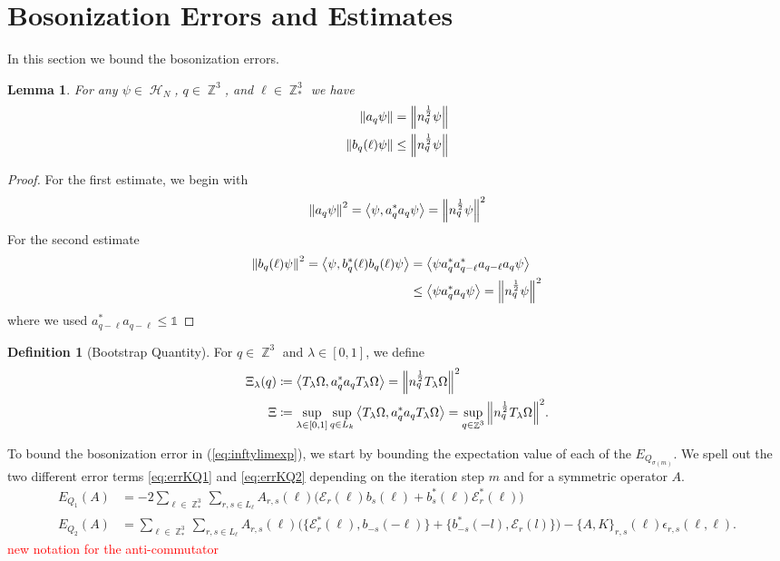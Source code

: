 \documentclass[sn-mathphys, Numbered ,a4paper]{sn-jnl}%
\DeclareMathOperator{\Z}{\mathbb{Z}}
\DeclareMathOperator{\HH}{\mathcal{H}}
\newcommand{\half}{\frac{1}{2}}
\newcommand{\eva}[1]{\left\langle #1 \right\rangle}
\theoremstyle{plain}
\newtheorem{lemma}[theorem]{Lemma}
\theoremstyle{definition}
\newtheorem{definition}[theorem]{Definition}
\theoremstyle{remark}
\theoremstyle{plain}
\theoremstyle{definition}
\theoremstyle{remark}
\begin{document}
\section{Bosonization Errors and Estimates}
In this section we bound the bosonization errors.
\begin{lemma}
	For any $\psi \in \HH_N$, $q \in \Z^3$, and $\ell \in \Z^3_*$ we have 
	\begin{align}
		\norm{a_q\psi}&= \norm{n_q^\half\psi} \\
		\norm{b_q(\ell)\psi}&\leq \norm{n_q^\half\psi}
	\end{align}
\end{lemma}
\begin{proof}
	For the first estimate, we begin with
	\begin{equation}
		\norm{a_q\psi}^2=\eva{\psi,a^*_q a_q\psi}=\norm{n_q^\half\psi}^2
	\end{equation}
For the second estimate
	\begin{align}
		\norm{b_q(\ell)\psi}^2=\eva{\psi,b^*_q(\ell) b_q(\ell)\psi} &=\eva{\psi a^*_q a^*_{q-\ell} a_{q-\ell} a_q\psi}\nonumber\\
		&\leq \eva{\psi a^*_q a_q\psi} = \norm{n_q^\half\psi}^2
	\end{align}
where we used $a^*_{q-\ell}a_{q-\ell}\leq \mathds{1}$ 
\end{proof}
\begin{definition}[Bootstrap Quantity]
 For $q\in \Z^3$ and $\lambda \in [0,1]$, we define 
    \begin{align}
        \Xi_{\lambda}(q) &\coloneq \expval{T_\lambda\Omega, a^*_qa_qT_\lambda\Omega} = \norm{n_q^\half T_{\lambda}\Omega}^2\\
        \Xi &\coloneq \sup\limits_{\lambda \in[0,1]}\sup\limits_{q \in L_k}\expval{T_\lambda\Omega, a^*_qa_qT_\lambda\Omega} = \sup\limits_{q \in \Z^3}\norm{n_q^\half T_{\lambda}\Omega}^2.
    \end{align}
\end{definition}

To bound the bosonization error in (\ref{eq:inftylimexp}), we start by bounding the expectation value of each of the $E_{Q_{\sigma(m)}}$. We spell out the two different error terms \eqref{eq:errKQ1} and \eqref{eq:errKQ2} depending on the iteration step $m$ and for a symmetric operator $A$.
\begin{align}
     E_{Q_1}(A)&=- 2 \sum\limits_{\ell \in \Z^3_*}\sum\limits_{r,s \in L_{\ell}}A_{r,s}(\ell)\Big(\mathcal{E}_{r}(\ell)b_{s}(\ell) + b^*_{s}(\ell)\mathcal{E}^*_{r}(\ell)\Big)\nonumber\\ 
    E_{Q_2}(A) &=
        \sum\limits_{\ell \in \Z^3_*}\sum\limits_{r,s \in L_{\ell}}A_{r,s}(\ell)\Big(\big\{\mathcal{E}^*_{r}(\ell), b_{-s}(-\ell)\big\} + \big\{ b^*_{-s}(-l),\mathcal{E}_r(l)\big\}\Big) - \big\{A,K\big\}_{r,s}(\ell)\epsilon_{r,s}(\ell,\ell) .\nonumber 
\end{align}
\textcolor{red}{new notation for the anti-commutator}
\end{document}
